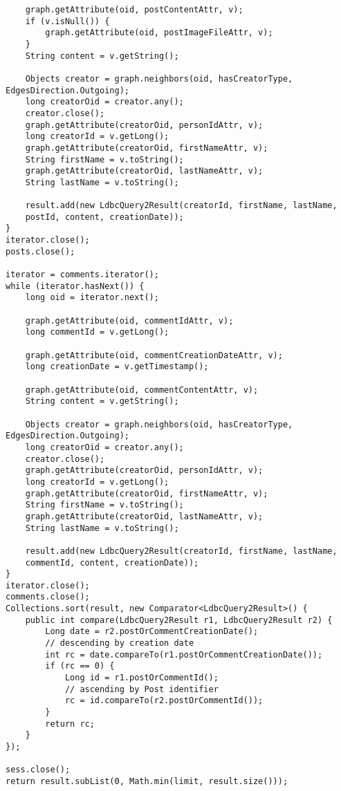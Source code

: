 {\begin{verbatim}
    graph.getAttribute(oid, postContentAttr, v);
    if (v.isNull()) {
        graph.getAttribute(oid, postImageFileAttr, v);
    }
    String content = v.getString();

    Objects creator = graph.neighbors(oid, hasCreatorType, EdgesDirection.Outgoing);
    long creatorOid = creator.any();
    creator.close();
    graph.getAttribute(creatorOid, personIdAttr, v);
    long creatorId = v.getLong();
    graph.getAttribute(creatorOid, firstNameAttr, v);
    String firstName = v.toString();
    graph.getAttribute(creatorOid, lastNameAttr, v);
    String lastName = v.toString();

    result.add(new LdbcQuery2Result(creatorId, firstName, lastName,
    postId, content, creationDate));
}
iterator.close();
posts.close();

iterator = comments.iterator();
while (iterator.hasNext()) {
    long oid = iterator.next();

    graph.getAttribute(oid, commentIdAttr, v);
    long commentId = v.getLong();

    graph.getAttribute(oid, commentCreationDateAttr, v);
    long creationDate = v.getTimestamp();

    graph.getAttribute(oid, commentContentAttr, v);
    String content = v.getString();

    Objects creator = graph.neighbors(oid, hasCreatorType, EdgesDirection.Outgoing);
    long creatorOid = creator.any();
    creator.close();
    graph.getAttribute(creatorOid, personIdAttr, v);
    long creatorId = v.getLong();
    graph.getAttribute(creatorOid, firstNameAttr, v);
    String firstName = v.toString();
    graph.getAttribute(creatorOid, lastNameAttr, v);
    String lastName = v.toString();

    result.add(new LdbcQuery2Result(creatorId, firstName, lastName,
    commentId, content, creationDate));
}
iterator.close();
comments.close();
Collections.sort(result, new Comparator<LdbcQuery2Result>() {
    public int compare(LdbcQuery2Result r1, LdbcQuery2Result r2) {
        Long date = r2.postOrCommentCreationDate();
        // descending by creation date
        int rc = date.compareTo(r1.postOrCommentCreationDate()); 
        if (rc == 0) {
            Long id = r1.postOrCommentId();
            // ascending by Post identifier
            rc = id.compareTo(r2.postOrCommentId()); 
        }
        return rc;
    }
});

sess.close();
return result.subList(0, Math.min(limit, result.size()));

\end{verbatim}
}

